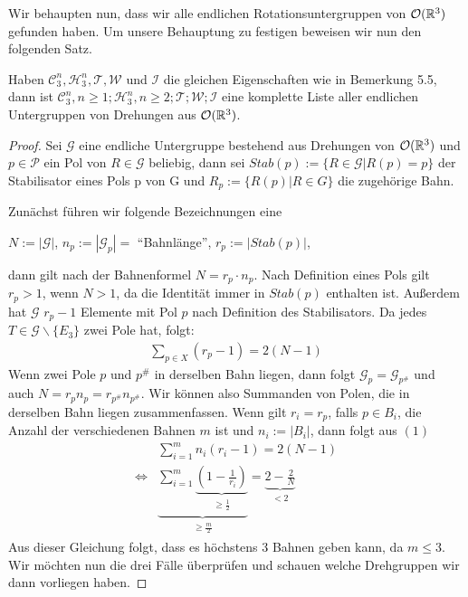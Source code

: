Wir behaupten nun, dass wir alle endlichen Rotationsuntergruppen von ${\mathcal{O}(\mathbb{R}^3)}$ gefunden haben. Um unsere Behauptung zu festigen beweisen wir nun den folgenden Satz.
\begin{theorem}
	Haben $\mathcal{C}^n_3,\mathcal{H}^n_3,\mathcal{T},\mathcal{W}$ und $\mathcal{I}$ die gleichen Eigenschaften wie in Bemerkung 5.5, dann ist $\mathcal{C}^n_3,n\geq1;\mathcal{H}^n_3,n\geq2;\mathcal{T};\mathcal{W};\mathcal{I}$ eine komplette Liste aller endlichen Untergruppen von Drehungen aus ${\mathcal{O}(\mathbb{R}^3)}$.
\end{theorem}
\begin{proof}
	Sei $\mathcal{G}$ eine endliche Untergruppe bestehend aus Drehungen von ${\mathcal{O}(\mathbb{R}^3)}$ und $p \in \mathcal{P}$ ein Pol von $R \in \mathcal{G}$ beliebig, dann sei $Stab(p) := \{R\in \mathcal{G} | R(p)=p\}$ der Stabilisator eines Pols p von G und $R_p := \{R(p) | R \in G \}$ die zugehörige Bahn.
	
	Zunächst führen wir folgende Bezeichnungen eine
	\begin{center}
		$N:=|\mathcal{G}|$, $n_p:=|\mathcal{G}_p|=$ "`Bahnlänge"', $r_p:=|Stab(p)|$,
	\end{center}
	dann gilt nach der Bahnenformel $N=r_p \cdot n_p$. Nach Definition eines Pols gilt $r_p > 1$, wenn $N > 1$, da die Identität immer in $Stab(p)$ enthalten ist. Außerdem hat $\mathcal{G}$ $r_p - 1$ Elemente mit Pol $p$ nach Definition des Stabilisators. Da jedes $T \in \mathcal{G}\backslash\{E_3\}$ zwei Pole hat, folgt:
	\setcounter{equation}{0}
	\begin{align}
	\sum_{p \in X}(r_p - 1)= 2(N-1)
	\end{align}
	Wenn zwei Pole $p$ und $p^{\#}$ in derselben Bahn liegen, dann folgt $\mathcal{G}_p=\mathcal{G}_{p^{\#}}$ und auch $N=r_p n_p=r_{p^{\#}} n_{p^{\#}}$. Wir können also Summanden von Polen, die in derselben Bahn liegen zusammenfassen. Wenn gilt $r_i=r_p$, falls $p\in B_i$, die Anzahl der verschiedenen Bahnen $m$ ist und $n_i:=|B_i|$, dann folgt aus $(1)$
	\begin{align}
	&\sum_{i=1}^m n_i(r_i-1)=2(N-1) \\
	\Leftrightarrow &\underbrace{\sum_{i=1}^m \underbrace{(1-\frac{1}{r_i})}_{\substack{\geq \frac{1}{2}}}}_{\substack{\geq \frac{m}{2}}}=\underbrace{2-\frac{2}{N}}_{\substack{<2}}
	\end{align}
	Aus dieser Gleichung folgt, dass es höchstens 3 Bahnen geben kann, da $m \leq 3$. Wir möchten nun die drei Fälle überprüfen und schauen welche Drehgruppen wir dann vorliegen haben.
	

\end{proof}
